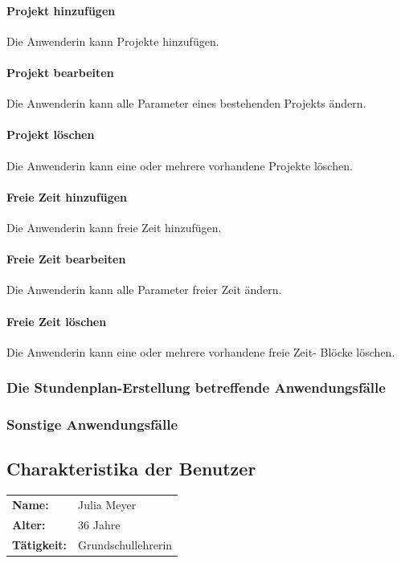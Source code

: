 \documentclass[fontsize=12pt,paper=a4,twoside]{scrartcl}
\begin{document}
\paragraph{Projekt hinzufügen}
Die Anwenderin kann Projekte hinzufügen.

\paragraph{Projekt bearbeiten}
Die Anwenderin kann alle Parameter eines bestehenden Projekts ändern.

\paragraph{Projekt löschen}
Die Anwenderin kann eine oder mehrere vorhandene Projekte löschen.

\paragraph{Freie Zeit hinzufügen}
Die Anwenderin kann freie Zeit hinzufügen.

\paragraph{Freie Zeit bearbeiten}
Die Anwenderin kann alle Parameter freier Zeit ändern.

\paragraph{Freie Zeit löschen}
Die Anwenderin kann eine oder mehrere vorhandene \glqq freie Zeit\grqq- Blöcke löschen.

\subsubsection{Die Stundenplan-Erstellung betreffende Anwendungsfälle}

\subsubsection{Sonstige Anwendungsfälle}

\subsection{Charakteristika der Benutzer}

\begin{tabular}{p{3cm}l}
\textbf{Name:} & Julia Meyer \\
\textbf{Alter:} & 36 Jahre\\
\textbf{Tätigkeit:} &  Grundschullehrerin\\
\end{tabular} \\
\end{document}
